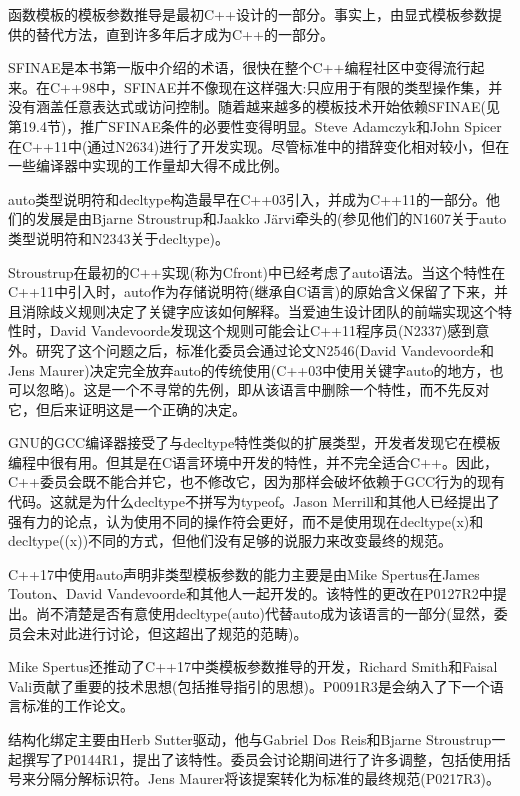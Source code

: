 函数模板的模板参数推导是最初C++设计的一部分。事实上，由显式模板参数提供的替代方法，直到许多年后才成为C++的一部分。

SFINAE是本书第一版中介绍的术语，很快在整个C++编程社区中变得流行起来。在C++98中，SFINAE并不像现在这样强大:只应用于有限的类型操作集，并没有涵盖任意表达式或访问控制。随着越来越多的模板技术开始依赖SFINAE(见第19.4节)，推广SFINAE条件的必要性变得明显。Steve Adamczyk和John Spicer在C++11中(通过N2634)进行了开发实现。尽管标准中的措辞变化相对较小，但在一些编译器中实现的工作量却大得不成比例。

auto类型说明符和decltype构造最早在C++03引入，并成为C++11的一部分。他们的发展是由Bjarne Stroustrup和Jaakko J{\"a}rvi牵头的(参见他们的N1607关于auto类型说明符和N2343关于decltype)。

Stroustrup在最初的C++实现(称为Cfront)中已经考虑了auto语法。当这个特性在C++11中引入时，auto作为存储说明符(继承自C语言)的原始含义保留了下来，并且消除歧义规则决定了关键字应该如何解释。当爱迪生设计团队的前端实现这个特性时，David Vandevoorde发现这个规则可能会让C++11程序员(N2337)感到意外。研究了这个问题之后，标准化委员会通过论文N2546(David Vandevoorde和Jens Maurer)决定完全放弃auto的传统使用(C++03中使用关键字auto的地方，也可以忽略)。这是一个不寻常的先例，即从该语言中删除一个特性，而不先反对它，但后来证明这是一个正确的决定。

GNU的GCC编译器接受了与decltype特性类似的扩展类型，开发者发现它在模板编程中很有用。但其是在C语言环境中开发的特性，并不完全适合C++。因此，C++委员会既不能合并它，也不修改它，因为那样会破坏依赖于GCC行为的现有代码。这就是为什么decltype不拼写为typeof。Jason Merrill和其他人已经提出了强有力的论点，认为使用不同的操作符会更好，而不是使用现在decltype(x)和decltype((x))不同的方式，但他们没有足够的说服力来改变最终的规范。

C++17中使用auto声明非类型模板参数的能力主要是由Mike Spertus在James Touton、David Vandevoorde和其他人一起开发的。该特性的更改在P0127R2中提出。尚不清楚是否有意使用decltype(auto)代替auto成为该语言的一部分(显然，委员会未对此进行讨论，但这超出了规范的范畴)。

Mike Spertus还推动了C++17中类模板参数推导的开发，Richard Smith和Faisal Vali贡献了重要的技术思想(包括推导指引的思想)。P0091R3是会纳入了下一个语言标准的工作论文。

结构化绑定主要由Herb Sutter驱动，他与Gabriel Dos Reis和Bjarne Stroustrup一起撰写了P0144R1，提出了该特性。委员会讨论期间进行了许多调整，包括使用括号来分隔分解标识符。Jens Maurer将该提案转化为标准的最终规范(P0217R3)。





